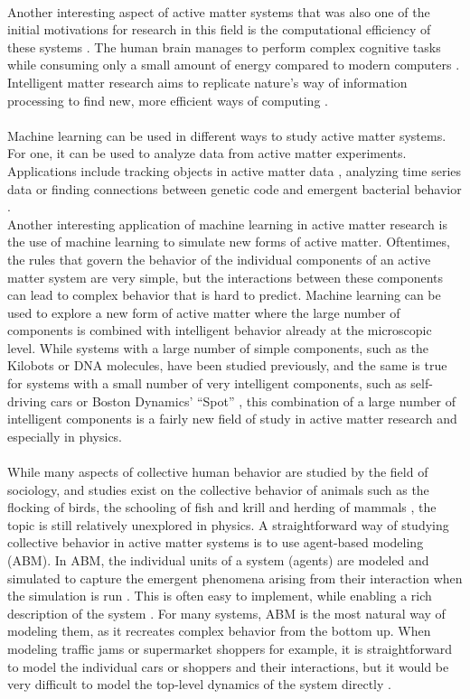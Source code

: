 \\
Another interesting aspect of active matter systems that was also one of the initial motivations for research in this field is the computational efficiency of these systems \cite{kaspar_rise_2021}. The human brain manages to perform complex cognitive tasks while consuming only a small amount of energy compared to modern computers \cite{balasubramanian_brain_2021}. Intelligent matter research aims to replicate nature's way of information processing to find new, more efficient ways of computing \cite{kaspar_rise_2021}. 
\\
\\
Machine learning can be used in different ways to study active matter systems. For one, it can be used to analyze data from active matter experiments. Applications include tracking objects in active matter data \cite{cichos_machine_2020}, analyzing time series data \cite{cichos_machine_2020} or finding connections between genetic code and emergent bacterial behavior \cite{cichos_machine_2020}. 
\\
Another interesting application of machine learning in active matter research is the use of machine learning to simulate new forms of active matter. Oftentimes, the rules that govern the behavior of the individual components of an active matter system are very simple, but the interactions between these components can lead to complex behavior that is hard to predict. Machine learning can be used to explore a new form of active matter where the large number of components is combined with intelligent behavior already at the microscopic level. While systems with a large number of simple components, such as the Kilobots or DNA molecules, have been studied previously, and the same is true for systems with a small number of very intelligent components, such as self-driving cars or Boston Dynamics' \enquote{Spot} \cite{bostondynamics_spot_2024,koval_experimental_2022}, this combination of a large number of intelligent components is a fairly new field of study in active matter research and especially in physics. 
\\
\\
While many aspects of collective human behavior are studied by the field of sociology, and studies exist on the collective behavior of animals such as the flocking of birds, the schooling of fish and krill and herding of mammals \cite{wiki_collective_2024}, the topic is still relatively unexplored in physics. A straightforward way of studying collective behavior in active matter systems is to use agent-based modeling (ABM). In ABM, the individual units of a system (agents) are modeled and simulated to capture the emergent phenomena arising from their interaction when the simulation is run \cite{bonabeau_agent-based_2002}. This is often easy to implement, while enabling a rich description of the system \cite{bonabeau_agent-based_2002}. For many systems, ABM is the most natural way of modeling them, as it recreates complex behavior from the bottom up. When modeling traffic jams or supermarket shoppers for example, it is straightforward to model the individual cars or shoppers and their interactions, but it would be very difficult to model the top-level dynamics of the system directly \cite{bonabeau_agent-based_2002}.
